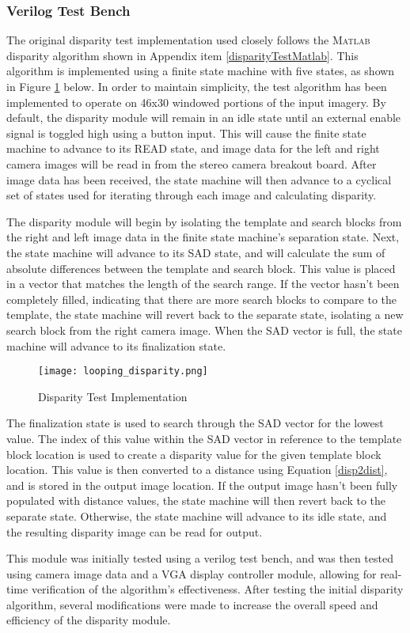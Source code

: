 \subsubsection{Verilog Test Bench}
The original disparity test implementation used closely follows the \textsc{Matlab} disparity algorithm shown in Appendix item \ref{disparityTestMatlab}. This algorithm is implemented using a finite state machine with five states, as shown in Figure \ref{disparityTestImp} below. In order to maintain simplicity, the test algorithm has been implemented to operate on 46x30 windowed portions of the input imagery. By default, the disparity module will remain in an idle state until an external enable signal is toggled high using a button input. This will cause the finite state machine to advance to its READ state, and image data for the left and right camera images will be read in from the stereo camera breakout board. After image data has been received, the state machine will then advance to a cyclical set of states used for iterating through each image and calculating disparity. 
\par
The disparity module will begin by isolating the template and search blocks from the right and left image data in the finite state machine's separation state. Next, the state machine will advance to its SAD state, and will calculate the sum of absolute differences between the template and search block. This value is placed in a vector that matches the length of the search range. If the vector hasn't been completely filled, indicating that there are more search blocks to compare to the template, the state machine will revert back to the separate state, isolating a new search block from the right camera image. When the SAD vector is full, the state machine will advance to its finalization state. 
\par
\begin{figure}[H]
	\centerline{\texttt{[image: looping\_disparity.png]}}
	\caption{Disparity Test Implementation}
	\label{disparityTestImp}
\end{figure}
\par
The finalization state is used to search through the SAD vector for the lowest value. The index of this value within the SAD vector in reference to the template block location is used to create a disparity value for the given template block location. This value is then converted to a distance using Equation \ref{disp2dist}, and is stored in the output image location. If the output image hasn't been fully populated with distance values, the state machine will then revert back to the separate state. Otherwise, the state machine will advance to its idle state, and the resulting disparity image can be read for output. 
\par
This module was initially tested using a verilog test bench, and was then tested using camera image data and a VGA display controller module, allowing for real-time verification of the algorithm's effectiveness. After testing the initial disparity algorithm, several modifications were made to increase the overall speed and efficiency of the disparity module. 
